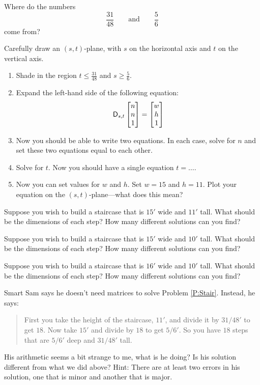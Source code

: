 \begin{prob}
Where do the numbers 
\[
\frac{31}{48}\qquad\text{and}\qquad \frac{5}{6}
\]
come from?
\end{prob}


\begin{prob}
Carefully draw an $(s,t)$-plane, with $s$ on the horizontal axis and $t$ on the vertical axis. 
\begin{enumerate}
\item Shade in the region  $t\le \frac{31}{48}$ and $s\ge \frac{5}{6}$.
\item Expand the left-hand side of the following equation: 
\[
\mathsf{D}_{s,t}
\begin{bmatrix}
n \\ n \\ 1
\end{bmatrix}
= 
\begin{bmatrix}
w \\
h \\
1
\end{bmatrix}
\]
\item Now you should be able to write two equations. In each case, solve for $n$ and set these two equations equal to each other. 
\item Solve for $t$. Now you should have a single equation $t= \dots$.
\item Now you can set values for $w$ and $h$. Set $w = 15$ and $h=11$. Plot your equation on the $(s,t)$-plane---what does this mean?
\end{enumerate}
\end{prob}


\begin{prob}\label{P:Stair}
Suppose you wish to build a staircase that is $15'$ wide and $11'$
tall. What should be the dimensions of each step? How many different
solutions can you find?
\end{prob}

\begin{prob}
Suppose you wish to build a staircase that is $15'$ wide and $10'$
tall. What should be the dimensions of each step? How many different
solutions can you find?
\end{prob}

\begin{prob}
Suppose you wish to build a staircase that is $16'$ wide and $10'$
tall. What should be the dimensions of each step? How many different
solutions can you find?
\end{prob}


\begin{prob}
Smart Sam says he doesn't need matrices to solve
Problem \ref{P:Stair}. Instead, he says:
\begin{quote}
First you take the height of the staircase, $11'$, and divide it by
$31/48'$ to get $18$. Now take $15'$ and divide by $18$ to get
$5/6'$. So you have $18$ steps that are $5/6'$ deep and $31/48'$ tall.
\end{quote}
His arithmetic seems a bit strange to me, what is he doing?  Is his
solution different from what we did above? Hint: There are at least
two errors in his solution, one that is minor and another that is
major.
\end{prob}
